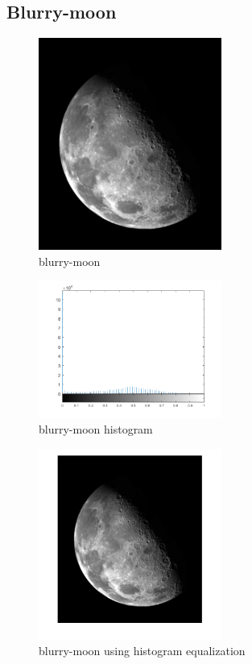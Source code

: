 \documentclass[conference]{IEEEtran}
\begin{document}
\subsection{Blurry-moon}

\begin{figure}[H]
\centerline{\includegraphics[width=6cm]{blurry-moon.png}}
\caption{blurry-moon}
\label{blurry-moon}
\end{figure}


\begin{figure}[H]
\centerline{\includegraphics[width=6cm]{blurry-moon_hist.png}}
\caption{blurry-moon histogram}
\label{blurry-moon_hist}
\end{figure}

\begin{figure}[H]
\centerline{\includegraphics[width=6cm]{blurry-moon_histeq.png}}
\caption{blurry-moon using histogram equalization}
\label{blurry-moon_histeq}
\end{figure}
\end{document}
